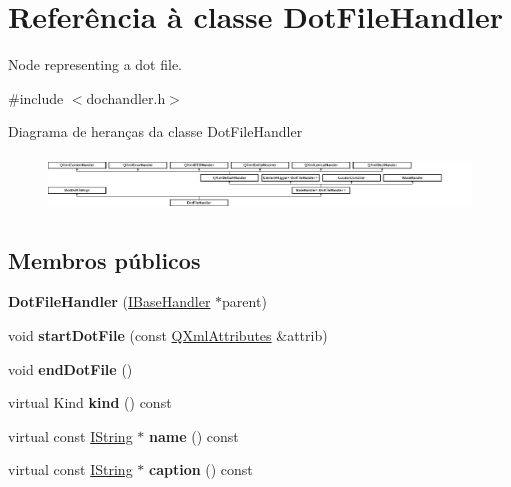 \hypertarget{class_dot_file_handler}{\section{Referência à classe Dot\-File\-Handler}
\label{class_dot_file_handler}
}


Node representing a dot file.  




{\ttfamily \#include $<$dochandler.\-h$>$}

Diagrama de heranças da classe Dot\-File\-Handler\begin{figure}[H]
\begin{center}
\leavevmode
\includegraphics[height=1.474654cm]{class_dot_file_handler}
\end{center}
\end{figure}
\subsection*{Membros públicos}
\begin{DoxyCompactItemize}
\item 
\hypertarget{class_dot_file_handler_af427e1f0304c5634e5fc4052b766853a}{{\bfseries Dot\-File\-Handler} (\hyperlink{class_i_base_handler}{I\-Base\-Handler} $\ast$parent)}\label{class_dot_file_handler_af427e1f0304c5634e5fc4052b766853a}

\item 
\hypertarget{class_dot_file_handler_aeed29696a81bd6c507050a848768e748}{void {\bfseries start\-Dot\-File} (const \hyperlink{class_q_xml_attributes}{Q\-Xml\-Attributes} \&attrib)}\label{class_dot_file_handler_aeed29696a81bd6c507050a848768e748}

\item 
\hypertarget{class_dot_file_handler_a6d3aff24a1c21d1f6386a3b03b9f02a2}{void {\bfseries end\-Dot\-File} ()}\label{class_dot_file_handler_a6d3aff24a1c21d1f6386a3b03b9f02a2}

\item 
\hypertarget{class_dot_file_handler_af8e62c8a81ddf2283205cc8955de50eb}{virtual Kind {\bfseries kind} () const }\label{class_dot_file_handler_af8e62c8a81ddf2283205cc8955de50eb}

\item 
\hypertarget{class_dot_file_handler_a61b3e127d271cd613cc928e35f60125e}{virtual const \hyperlink{class_i_string}{I\-String} $\ast$ {\bfseries name} () const }\label{class_dot_file_handler_a61b3e127d271cd613cc928e35f60125e}

\item 
\hypertarget{class_dot_file_handler_a044136005e1897ffcdd89f6c73c25c80}{virtual const \hyperlink{class_i_string}{I\-String} $\ast$ {\bfseries caption} () const }\label{class_dot_file_handler_a044136005e1897ffcdd89f6c73c25c80}

\end{DoxyCompactItemize}
